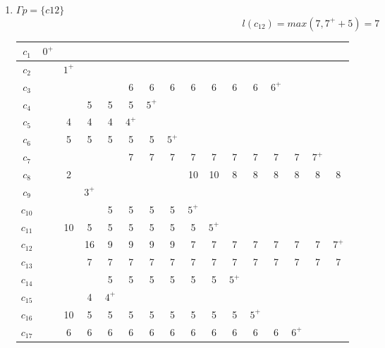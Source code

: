 \documentclass[12pt, a4paper] {ncc}
\begin{document}
\begin{enumerate}
	\item $\Gamma p = \{ c{12}\}$
	$$l(c_{12}) = max(7, 7^+ + 5) = 7 $$
\begin{tabular} {|c|c|c|c|c|c|c|c|c|c|c|c|c|c|c|c|}
    \hline
    $c_{1}$  &$0^+$&      &     &     &     &     &     &      &     &     &     &     &     &      &         \\ \hline
    $c_{2}$  & \z  &$1^+$ &     &     &     &     &     &      &     &     &     &     &     &      &         \\ \hline
    $c_{3}$  & \z  & \z   & \z  &\z   & 6   &  6  &  6  &  6   & 6   & 6   & 6   &$6^+$&     &      &         \\ \hline
    $c_{4}$  & \z  & \z   & 5   & 5   & 5   &$5^+$&     &      &     &     &     &     &     &      &         \\ \hline
    $c_{5}$  & \z  & 4    & 4   & 4   &$4^+$&     &     &      &     &     &     &     &     &      &         \\ \hline
    $c_{6}$  & \z  & 5    & 5   & 5   & 5   &  5  &$5^+$&      &     &     &     &     &     &      &         \\ \hline
    $c_{7}$  & \z  & \z   & \z  & \z  & 7   &  7  &  7  &  7   & 7   & 7   & 7   &7    & 7   & $7^+$&            \\ \hline
    $c_{8}$  & \z  & 2    & \z  & \z  & \z  &  \z & \z  &  10  & 10  & 8   & 8   &8    & 8   &  8   & 8       \\ \hline
    $c_{9}$  & \z  & \z   &$3^+$&     &     &     &     &      &     &     &     &     &     &      &         \\ \hline
    $c_{10}$ & \z  & \z   & \z  & 5   & 5   &  5  &  5  &$5^+$ &     &     &     &     &     &      &         \\ \hline
    $c_{11}$ & \z  & 10   &  5  & 5   & 5   &  5  &  5  &  5   &$5^+$&     &     &     &     &      &         \\ \hline
    $c_{12}$ & \z  & \z   & 16  & 9   & 9   &  9  &  9  &  7   & 7   & 7   & 7   & 7   & 7   &  7   &$7^+$        \\ \hline
    $c_{13}$ & \z  & \z   & 7   & 7   & 7   &  7  &  7  &  7   & 7   & 7   & 7   & 7   & 7   &  7   & 7      \\ \hline
    $c_{14}$ & \z  & \z   & \z  & 5   & 5   &  5  &  5  &  5   & 5   &$5^+$&     &     &     &      &         \\ \hline
    $c_{15}$ & \z  & \z   & 4   &$4^+$&     &     &     &      &     &     &     &     &     &      &         \\ \hline
    $c_{16}$ & \z  & 10   & 5   & 5   & 5   &  5  &  5  &  5   & 5   & 5   &$5^+$&     &     &      &         \\ \hline
    $c_{17}$ & \z  & 6    & 6   & 6   & 6   &  6  &  6  &  6   & 6   & 6   & 6   & 6   &$6^+$&      &        \\ \hline 
\end{tabular}


\end{enumerate}
\end{document}
